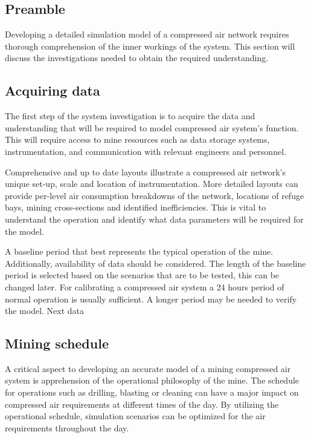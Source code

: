 	\subsection{Preamble}
		Developing a detailed simulation model of a compressed air network requires thorough comprehension of the inner workings of the system. This section will discuss the investigations needed to obtain the required understanding.
	\subsection{Acquiring data} %
	The first step of the system investigation is to acquire the data and understanding that will be required to model compressed air system's function. This will require access to mine resources such as data storage systems, instrumentation, and communication with relevant engineers and personnel.
	\par 
	Comprehensive and up to date layouts illustrate a compressed air network's unique set-up, scale and location of instrumentation. More detailed layouts can provide per-level air consumption breakdowns of the network, locations of refuge bays, mining cross-sections and identified inefficiencies. This is vital to understand the operation and identify what data parameters will be required for the model. 
	\par 
	A baseline period that best represents the typical operation of the mine. Additionally, availability of data should be considered. The length of the baseline period is selected based on the scenarios that are to be tested, this can be changed later. For calibrating a compressed air system a 24 hours period of normal operation is usually sufficient. A longer period may be needed to verify the model.
	Next data 
	\subsection{Mining schedule}
	A critical aspect to developing an accurate model of a mining compressed air system is apprehension of the operational philosophy of the mine. The schedule for operations such as drilling,  blasting or cleaning can have a major impact on compressed air requirements at different times of the day. By utilizing the operational schedule, simulation scenarios can be optimized for the air requirements throughout the day.	
	
